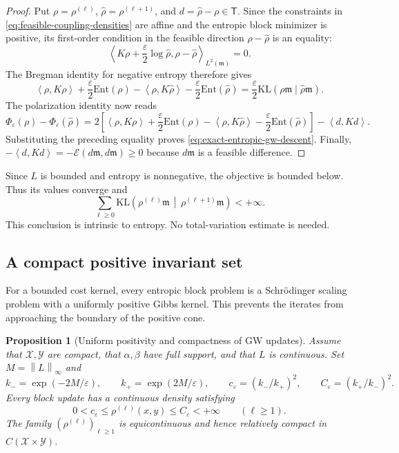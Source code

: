\documentclass[11pt]{article}
\newtheorem{proposition}[theorem]{Proposition}
\theoremstyle{definition}
\theoremstyle{remark}
\newcommand{\Ee}{\mathcal E}
\newcommand{\eps}{\varepsilon}
\newcommand{\KL}{\mathrm{KL}}
\newcommand{\Ent}{\mathrm{Ent}}
\newcommand{\ip}[2]{\left\langle #1,#2\right\rangle}
\newcommand{\norm}[1]{\left\lVert #1\right\rVert}
\begin{document}
\begin{proof}
Put \(\rho=\rho^{(\ell)}\), \(\widehat\rho=\rho^{(\ell+1)}\), and
\(d=\widehat\rho-\rho\in\mathsf T\).  Since the constraints in
\eqref{eq:feasible-coupling-densities} are affine and the entropic block
minimizer is positive, its first-order condition in the feasible direction
\(\rho-\widehat\rho\) is an equality:
\[
 \ip{K\rho+\frac\eps2\log\widehat\rho}
     {\rho-\widehat\rho}_{L^2(\mathfrak m)}
 =0.
\]
The Bregman identity for negative entropy therefore gives
\[
 \ip{\rho}{K\rho}+\frac\eps2\Ent(\rho)
 -\ip{\rho}{K\widehat\rho}-\frac\eps2\Ent(\widehat\rho)
 =
 \frac\eps2\KL(\rho\mathfrak m\mid\widehat\rho\mathfrak m).
\]
The polarization identity now reads
\[
 \Phi_\eps(\rho)-\Phi_\eps(\widehat\rho)
 =
 2\left[
  \ip{\rho}{K\rho}+\frac\eps2\Ent(\rho)
  -\ip{\rho}{K\widehat\rho}-\frac\eps2\Ent(\widehat\rho)
 \right]
 -\ip{d}{Kd}.
\]
Substituting the preceding equality proves
\eqref{eq:exact-entropic-gw-descent}.  Finally,
\(-\ip{d}{Kd}=-\Ee(d\mathfrak m,d\mathfrak m)\geq0\) because
\(d\mathfrak m\) is a feasible difference.
\end{proof}

Since \(L\) is bounded and entropy is nonnegative, the objective is bounded
below.  Thus its values converge and
\begin{equation}\label{eq:summable-intrinsic-descent}
 \sum_{\ell\geq0}
 \KL\!\left(
   \rho^{(\ell)}\mathfrak m
   \,\middle|\,
   \rho^{(\ell+1)}\mathfrak m
 \right)
 <+\infty.
\end{equation}
This conclusion is intrinsic to entropy.  No total-variation estimate is
needed.

\subsection{A compact positive invariant set}

For a bounded cost kernel, every entropic block problem is a Schr\"odinger
scaling problem with a uniformly positive Gibbs kernel.  This prevents the
iterates from approaching the boundary of the positive cone.

\begin{proposition}[Uniform positivity and compactness of GW updates]
\label{prop:uniform-positive-gw-updates}
Assume that \(\mathcal X,\mathcal Y\) are compact, that
\(\alpha,\beta\) have full support, and that \(L\) is continuous.  Set
\(M=\norm{L}_\infty\) and
\[
 k_-=\exp(-2M/\eps),
 \qquad
 k_+=\exp(2M/\eps),
 \qquad
 c_\eps=(k_-/k_+)^2,
 \qquad
 C_\eps=(k_+/k_-)^2.
\]
Every block update has a continuous density satisfying
\begin{equation}\label{eq:uniform-density-box}
 0<c_\eps\leq\rho^{(\ell)}(x,y)\leq C_\eps<+\infty
 \qquad(\ell\geq1).
\end{equation}
The family \((\rho^{(\ell)})_{\ell\geq1}\) is equicontinuous and hence
relatively compact in \(C(\mathcal X\times\mathcal Y)\).
\end{proposition}
\end{document}
